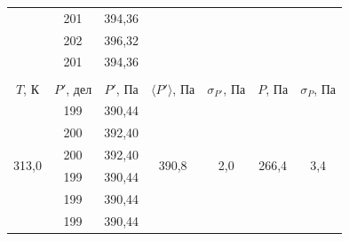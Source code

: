 \documentclass[a4paper, 12pt]{article}
\begin{document}
\begin{table}[H]
\begin{tabular}{ccccccc}
                \multicolumn{1}{|c|}{} & \multicolumn{1}{c|}{201} & \multicolumn{1}{c|}{394,36} & \multicolumn{1}{c|}{} & \multicolumn{1}{c|}{} & \multicolumn{1}{c|}{} & \multicolumn{1}{c|}{} \\ \cline{2-3}
                \multicolumn{1}{|c|}{} & \multicolumn{1}{c|}{202} & \multicolumn{1}{c|}{396,32} & \multicolumn{1}{c|}{} & \multicolumn{1}{c|}{} & \multicolumn{1}{c|}{} & \multicolumn{1}{c|}{} \\ \cline{2-3}
                \multicolumn{1}{|c|}{} & \multicolumn{1}{c|}{201} & \multicolumn{1}{c|}{394,36} & \multicolumn{1}{c|}{} & \multicolumn{1}{c|}{} & \multicolumn{1}{c|}{} & \multicolumn{1}{c|}{} \\ \hline
    		&
    		&
    		&
    		&
    		&
    		&
    		\\ \hline
    		\multicolumn{1}{|c|}{$ T $, К} &
    		\multicolumn{1}{c|}{$ P' $, дел} &
    		\multicolumn{1}{c|}{$ P' $, Па} &
    		\multicolumn{1}{c|}{$ \langle P' \rangle $, Па} &
    		\multicolumn{1}{c|}{$ \sigma_{P'} $, Па} &
    		\multicolumn{1}{c|}{$ P $, Па} &
    		\multicolumn{1}{c|}{$ \sigma_P $, Па} \\ \hline
                \multicolumn{1}{|c|}{\multirow{10}{*}{313,0}} & \multicolumn{1}{c|}{199} & \multicolumn{1}{c|}{390,44} & \multicolumn{1}{c|}{\multirow{10}{*}{390,8}} & \multicolumn{1}{c|}{\multirow{10}{*}{2,0}} & \multicolumn{1}{c|}{\multirow{10}{*}{266,4}} & \multicolumn{1}{c|}{\multirow{10}{*}{3,4}} \\ \cline{2-3}
                \multicolumn{1}{|c|}{} & \multicolumn{1}{c|}{200} & \multicolumn{1}{c|}{392,40} & \multicolumn{1}{c|}{} & \multicolumn{1}{c|}{} & \multicolumn{1}{c|}{} & \multicolumn{1}{c|}{} \\ \cline{2-3}
                \multicolumn{1}{|c|}{} & \multicolumn{1}{c|}{200} & \multicolumn{1}{c|}{392,40} & \multicolumn{1}{c|}{} & \multicolumn{1}{c|}{} & \multicolumn{1}{c|}{} & \multicolumn{1}{c|}{} \\ \cline{2-3}
                \multicolumn{1}{|c|}{} & \multicolumn{1}{c|}{199} & \multicolumn{1}{c|}{390,44} & \multicolumn{1}{c|}{} & \multicolumn{1}{c|}{} & \multicolumn{1}{c|}{} & \multicolumn{1}{c|}{} \\ \cline{2-3}
                \multicolumn{1}{|c|}{} & \multicolumn{1}{c|}{199} & \multicolumn{1}{c|}{390,44} & \multicolumn{1}{c|}{} & \multicolumn{1}{c|}{} & \multicolumn{1}{c|}{} & \multicolumn{1}{c|}{} \\ \cline{2-3}
                \multicolumn{1}{|c|}{} & \multicolumn{1}{c|}{199} & \multicolumn{1}{c|}{390,44} & \multicolumn{1}{c|}{} & \multicolumn{1}{c|}{} & \multicolumn{1}{c|}{} & \multicolumn{1}{c|}{} \\ \cline{2-3}

\end{tabular}
\end{table}
\end{document}
